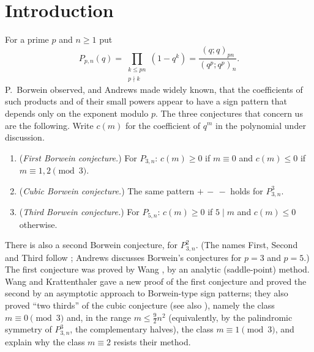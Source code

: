 \section{Introduction}\label{sec:intro}

For a prime $p$ and $n\ge1$ put
\[
P_{p,n}(q)=\prod_{\substack{k\le pn\\ p\nmid k}}(1-q^k)=\frac{(q;q)_{pn}}{(q^p;q^p)_n}.
\]
P.~Borwein observed, and Andrews \cite{Andrews} made widely known, that the coefficients of such products and of their
small powers appear to have a sign pattern that depends only on the exponent modulo $p$.
The three conjectures that concern us are the following. Write $c(m)$ for the coefficient of $q^m$ in the polynomial
under discussion.
\begin{enumerate}
\item (\emph{First Borwein conjecture.}) For $P_{3,n}$: $c(m)\ge0$ if $m\equiv0$ and $c(m)\le0$ if $m\equiv1,2\pmod 3$.
\item (\emph{Cubic Borwein conjecture.}) The same pattern $+\,-\,-$ holds for $P_{3,n}^3$.
\item (\emph{Third Borwein conjecture.}) For $P_{5,n}$: $c(m)\ge0$ if $5\mid m$ and $c(m)\le0$ otherwise.
\end{enumerate}
There is also a second Borwein conjecture, for $P_{3,n}^2$. (The names First, Second and Third follow
\cite{WK,BerkovichDhar}; Andrews \cite{Andrews} discusses Borwein's conjectures for $p=3$ and $p=5$.) The first conjecture was
proved by Wang \cite{Wang}, by an analytic (saddle-point) method. Wang and Krattenthaler \cite{WK} gave a new proof of the first
conjecture and proved the second by an asymptotic approach to Borwein-type sign patterns; they also proved ``two thirds'' of
the cubic conjecture (see also \cite[\S1]{BerkovichDhar}), namely the class $m\equiv0\pmod3$ and, in the range
$m\le\frac92n^2$ (equivalently, by the palindromic symmetry of $P_{3,n}^3$, the complementary halves), the class
$m\equiv1\pmod3$, and explain \cite[\S11]{WK} why the class $m\equiv2$ resists their method.
